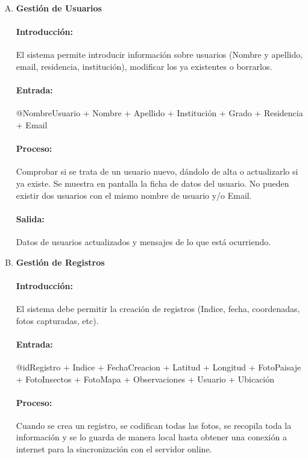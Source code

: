         \begin{enumerate}[A.]

        \item \textbf{Gestión de Usuarios}
        
        \paragraph{Introducción:} El sistema permite introducir información sobre usuarios (Nombre y apellido, email, residencia, institución), modificar los ya existentes o borrarlos.
        
        \paragraph{Entrada:} @NombreUsuario + Nombre + Apellido + Institución + Grado + Residencia + Email
        
        \paragraph{Proceso:} Comprobar si se trata de un usuario nuevo, dándolo de alta o actualizarlo si ya existe.
        Se muestra en pantalla la ficha de datos del usuario. No pueden existir dos usuarios con el mismo nombre de usuario y/o Email. 
        
        \paragraph{Salida:} Datos de usuarios actualizados y mensajes de lo que está ocurriendo.
        
        \item \textbf{Gestión de Registros}
        
        \paragraph{Introducción:} El sistema debe permitir la  creación de registros (Indice, fecha, coordenadas, fotos capturadas, etc). 
        
        \paragraph{Entrada:} @idRegistro + Indice + FechaCreacion + Latitud + Longitud + FotoPaisaje + FotoInsectos + FotoMapa + Observaciones + Usuario + Ubicación 
        
        \paragraph{Proceso:} Cuando se crea un registro, se codifican todas las fotos, se recopila toda la información y se lo guarda de manera local hasta obtener una conexión a internet para la sincronización con el servidor online.


\end{enumerate}
